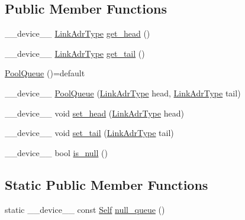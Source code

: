 \subsection*{Public Member Functions}
\begin{DoxyCompactItemize}
\item 
\-\_\-\-\_\-device\-\_\-\-\_\- \hyperlink{structutil_1_1PoolQueue_3_01Adr_3_01ADR__TYPE_01_4_01_4_a6a40a095e6f1bc5fabe6651ac01da837}{Link\-Adr\-Type} \hyperlink{structutil_1_1PoolQueue_3_01Adr_3_01ADR__TYPE_01_4_01_4_a4a30f1dd66f606b719498871ef581f21}{get\-\_\-head} ()
\item 
\-\_\-\-\_\-device\-\_\-\-\_\- \hyperlink{structutil_1_1PoolQueue_3_01Adr_3_01ADR__TYPE_01_4_01_4_a6a40a095e6f1bc5fabe6651ac01da837}{Link\-Adr\-Type} \hyperlink{structutil_1_1PoolQueue_3_01Adr_3_01ADR__TYPE_01_4_01_4_a80576042e04b9b9f2e199eb362df119a}{get\-\_\-tail} ()
\item 
\hyperlink{structutil_1_1PoolQueue_3_01Adr_3_01ADR__TYPE_01_4_01_4_a8a52fb037f0d3a48f3189ff1505aec10}{Pool\-Queue} ()=default
\item 
\-\_\-\-\_\-device\-\_\-\-\_\- \hyperlink{structutil_1_1PoolQueue_3_01Adr_3_01ADR__TYPE_01_4_01_4_a40650d4ac7aaed54887f38a1ff1d4142}{Pool\-Queue} (\hyperlink{structutil_1_1PoolQueue_3_01Adr_3_01ADR__TYPE_01_4_01_4_a6a40a095e6f1bc5fabe6651ac01da837}{Link\-Adr\-Type} head, \hyperlink{structutil_1_1PoolQueue_3_01Adr_3_01ADR__TYPE_01_4_01_4_a6a40a095e6f1bc5fabe6651ac01da837}{Link\-Adr\-Type} tail)
\item 
\-\_\-\-\_\-device\-\_\-\-\_\- void \hyperlink{structutil_1_1PoolQueue_3_01Adr_3_01ADR__TYPE_01_4_01_4_ac4c56898bdc6ac9e49d1074bb708df3b}{set\-\_\-head} (\hyperlink{structutil_1_1PoolQueue_3_01Adr_3_01ADR__TYPE_01_4_01_4_a6a40a095e6f1bc5fabe6651ac01da837}{Link\-Adr\-Type} head)
\item 
\-\_\-\-\_\-device\-\_\-\-\_\- void \hyperlink{structutil_1_1PoolQueue_3_01Adr_3_01ADR__TYPE_01_4_01_4_a984e5db8c2fc7b5b5dc6b368cc5d7318}{set\-\_\-tail} (\hyperlink{structutil_1_1PoolQueue_3_01Adr_3_01ADR__TYPE_01_4_01_4_a6a40a095e6f1bc5fabe6651ac01da837}{Link\-Adr\-Type} tail)
\item 
\-\_\-\-\_\-device\-\_\-\-\_\- bool \hyperlink{structutil_1_1PoolQueue_3_01Adr_3_01ADR__TYPE_01_4_01_4_a17a474ee7bee72601bb9ac7b97e02f13}{is\-\_\-null} ()
\end{DoxyCompactItemize}
\subsection*{Static Public Member Functions}
\begin{DoxyCompactItemize}
\item 
static \-\_\-\-\_\-device\-\_\-\-\_\- const \hyperlink{structutil_1_1PoolQueue_3_01Adr_3_01ADR__TYPE_01_4_01_4_a64eb6d023f5a3439af870e073f7f39cf}{Self} \hyperlink{structutil_1_1PoolQueue_3_01Adr_3_01ADR__TYPE_01_4_01_4_a4fd4e4f45f8d62e4e32526a37c0f5e64}{null\-\_\-queue} ()
\end{DoxyCompactItemize}
